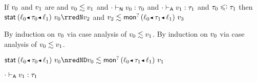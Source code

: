 \begin{lemma}\label{H-sta-A-bnd}
  If\/ $v_0$ and\/ $v_1$ are \reducedsurfaceexpressions{}
  and\/ $v_0 \lesssim v_1$
  and\/ ${\cdot} \vdash_{\mathsf{N}} v_0 : \tau_0$
  and\/ ${\cdot} \vdash_{\mathsf{A}} v_1 : \tau_1$
  and\/ $\stype_0 \subteq \stype_1$
  then\/ $\estab{\obnd{\sowner_0}{\stype_0}{\sowner_1}}{\svalue_0} \rredN \svalue_2$
  and\/ $\rexpr{\svalue_2}{\emopt{\obnd{\sowner_0}{\stype_1}{\sowner_1}}{\svalue_3}}$
\end{lemma}{
  \newcommand{\shortpf}{By induction on $\svalue_0$ via case analysis of $\rexpr{\svalue_0}{\svalue_1}$.}
\begin{lamportproof*}
  \shortpf
\mainproof
  \shortpf

    \begin{pfproof}
      \qedstep
        \begin{pfproof}
          {$\estab{\obnd{\sowner_0}{\stype_0}{\sowner_1}}{\svalue_0} \nredND \rexpr{\svalue_0}{\emopt{\obnd{\sowner_0}{\stype_1}{\sowner_1}}{\svalue_1}}$}
        \end{pfproof}
      \qedstep
    \end{pfproof}

    \begin{pfproof}
      \absurdstep
        \begin{pfproof}
          ${\cdot} \vdash_{\mathsf{A}} v_1 : \tau_1$
        \end{pfproof}
    \end{pfproof}


\end{lamportproof*}}
